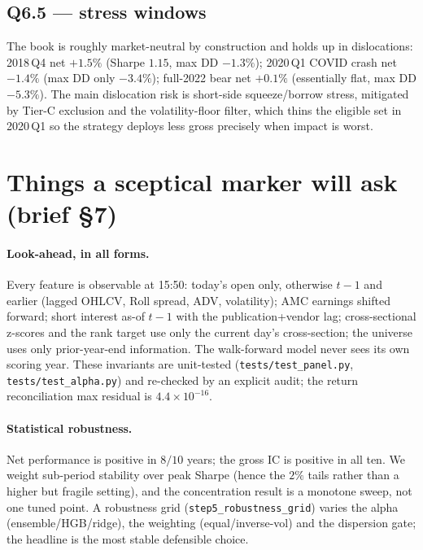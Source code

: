 \documentclass[11pt,a4paper]{article}
\newcommand{\code}[1]{\texttt{#1}}
\newcommand{\reconResid}{4.4\times10^{-16}}
\newcommand{\posYears}{8/10}
\begin{document}
\subsection{Q6.5 --- stress windows}
The book is roughly market-neutral by construction and holds up in dislocations: 2018\,Q4 net $+1.5\%$
(Sharpe $1.15$, max DD $-1.3\%$); 2020\,Q1 COVID crash net $-1.4\%$ (max DD only $-3.4\%$); full-2022 bear
net $+0.1\%$ (essentially flat, max DD $-5.3\%$). The main dislocation risk is short-side squeeze/borrow
stress, mitigated by Tier-C exclusion and the volatility-floor filter, which thins the eligible set in
2020\,Q1 so the strategy deploys less gross precisely when impact is worst.

\section{Things a sceptical marker will ask (brief §7)}

\paragraph{Look-ahead, in all forms.} Every feature is observable at 15:50: today's open only, otherwise
$t{-}1$ and earlier (lagged OHLCV, Roll spread, ADV, volatility); AMC earnings shifted forward; short interest
as-of $t{-}1$ with the publication+vendor lag; cross-sectional z-scores and the rank target use only the
current day's cross-section; the universe uses only prior-year-end information. The walk-forward model never
sees its own scoring year. These invariants are unit-tested (\code{tests/test\_panel.py},
\code{tests/test\_alpha.py}) and re-checked by an explicit audit; the return reconciliation max residual is
$\reconResid$.

\paragraph{Statistical robustness.} Net performance is positive in $\posYears$ years; the gross IC is positive
in all ten. We weight sub-period stability over peak Sharpe (hence the $2\%$ tails rather than a higher but
fragile setting), and the concentration result is a monotone sweep, not one tuned point. A robustness grid
(\code{step5\_robustness\_grid}) varies the alpha (ensemble/HGB/ridge), the weighting (equal/inverse-vol) and
the dispersion gate; the headline is the most stable defensible choice.
\end{document}
